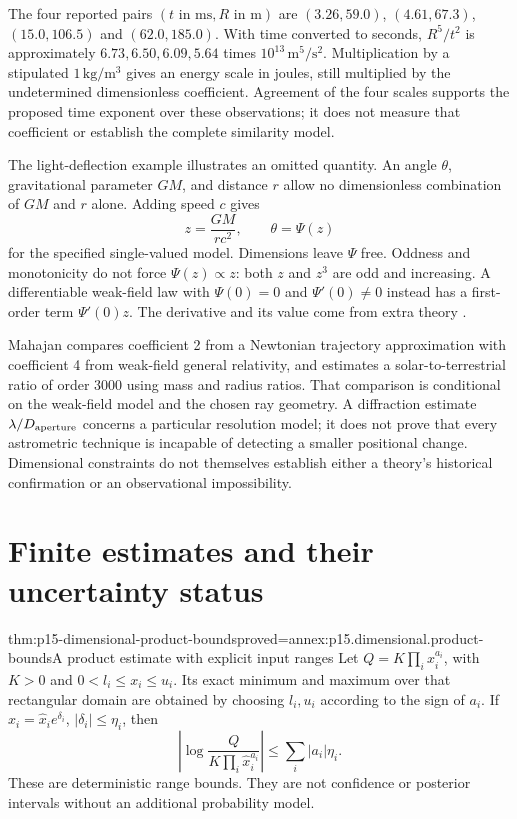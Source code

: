 The four reported pairs \((t\text{ in ms},R\text{ in m})\) are
\((3.26,59.0)\), \((4.61,67.3)\), \((15.0,106.5)\) and
\((62.0,185.0)\). With time converted to seconds,
\(R^5/t^2\) is approximately \(6.73,6.50,6.09,5.64\) times
\(10^{13}\,\mathrm{m^5/s^2}\). Multiplication by a stipulated
\(1\,\mathrm{kg/m^3}\) gives an energy scale in joules, still multiplied
by the undetermined dimensionless coefficient. Agreement of the four scales
supports the proposed time exponent over these observations; it does not
measure that coefficient or establish the complete similarity model.

The light-deflection example illustrates an omitted quantity. An angle
\(\theta\), gravitational parameter \(GM\), and distance \(r\) allow no
dimensionless combination of \(GM\) and \(r\) alone.
Adding speed \(c\) gives
\[
 z=\frac{GM}{rc^2},\qquad \theta=\Psi(z)
\]
for the specified single-valued model. Dimensions leave \(\Psi\) free.
Oddness and monotonicity do not force \(\Psi(z)\propto z\):
both \(z\) and \(z^3\) are odd and increasing.
A differentiable weak-field law with \(\Psi(0)=0\) and
\(\Psi'(0)\ne0\) instead has a first-order term \(\Psi'(0)z\).
The derivative and its value come from extra theory
\cite[5.3.1]{Mahajan2014Insight}.

Mahajan compares coefficient 2 from a Newtonian trajectory approximation
with coefficient 4 from weak-field general relativity,
and estimates a solar-to-terrestrial ratio of order \(3000\) using
mass and radius ratios. That comparison is conditional on the weak-field
model and the chosen ray geometry. A diffraction estimate
\(\lambda/D_{\rm aperture}\) concerns a particular resolution model; it
does not prove that every astrometric technique is incapable of detecting a
smaller positional change. Dimensional constraints do not themselves
establish either a theory's historical confirmation or an observational
impossibility.

\section{Finite estimates and their uncertainty status}
\label{sec:p15-dimensional-estimates}

\begin{hbtheorem}{thm:p15-dimensional-product-bounds}{proved=annex:p15.dimensional.product-bounds}{A product estimate with explicit input ranges}
Let \(Q=K\prod_i x_i^{a_i}\), with \(K>0\) and
\(0<l_i\leq x_i\leq u_i\).
Its exact minimum and maximum over that rectangular domain are obtained
by choosing \(l_i,u_i\) according to the sign of \(a_i\).
If \(x_i=\widehat x_i e^{\delta_i}\), \(|\delta_i|\leq\eta_i\), then
\[
 \left|\log\frac{Q}{K\prod_i\widehat x_i^{a_i}}\right|
 \leq\sum_i|a_i|\eta_i.
\]
These are deterministic range bounds. They are not confidence or posterior
intervals without an additional probability model.
\end{hbtheorem}

